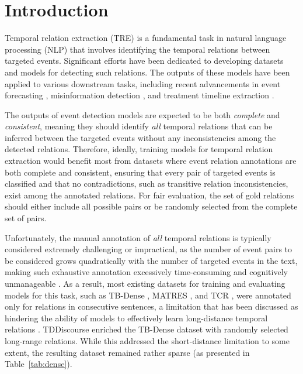 \section{Introduction}
\label{intro}
Temporal relation extraction (TRE) is a fundamental task in natural language processing (NLP) that involves identifying the temporal relations between targeted events. Significant efforts have been dedicated to developing datasets \cite{chambers-etal-2014-dense, gast-etal-2016-enriching, ning-etal-2018-multi} and models \cite{huang-etal-2023-classification, tan-etal-2023-event, niu-etal-2024-contempo} for detecting such relations. The outputs of these models have been applied to various downstream tasks, including recent advancements in event forecasting \cite{Ma2023ContextawareEF}, misinformation detection \cite{lei-huang-2023-identifying}, and treatment timeline extraction \cite{yao-etal-2024-overview}.

The outputs of event detection models are expected to be both \textit{complete} and \textit{consistent}, meaning they should identify \textit{all} temporal relations that can be inferred between the targeted events without any inconsistencies among the detected relations. Therefore, ideally, training models for temporal relation extraction would benefit most from datasets where event relation annotations are both complete and consistent, ensuring that every pair of targeted events is classified and that no contradictions, such as transitive relation inconsistencies, exist among the annotated relations. For fair evaluation, the set of gold relations should either include all possible pairs or be randomly selected from the complete set of pairs.

Unfortunately, the manual annotation of \textit{all} temporal relations is typically considered extremely challenging or impractical, as the number of event pairs to be considered grows quadratically with the number of targeted events in the text, making such exhaustive annotation excessively time-consuming and cognitively unmanageable \cite{naik-etal-2019-tddiscourse, rogers-etal-2024-narrativetime}. As a result, most existing datasets for training and evaluating models for this task, such as TB-Dense \cite{chambers-etal-2014-dense}, MATRES \cite{ning-etal-2018-multi}, and TCR \cite{ning-etal-2018-joint}, were annotated only for relations in consecutive sentences, a limitation that has been discussed as hindering the ability of models to effectively learn long-distance temporal relations \cite{naik-etal-2019-tddiscourse, alsayyahi-batista-navarro-2023-timeline}. TDDiscourse \cite{naik-etal-2019-tddiscourse} enriched the TB-Dense dataset with randomly selected long-range relations. While this addressed the short-distance limitation to some extent, the resulting dataset remained rather sparse (as presented in Table~\ref{tab:dense}).

